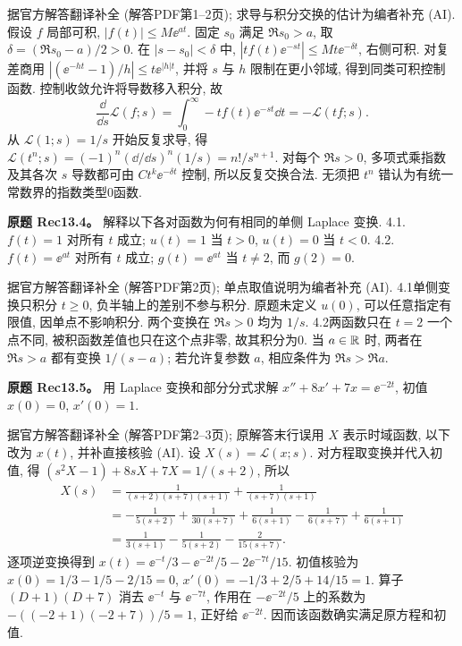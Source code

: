 \begin{solution}
据官方解答翻译补全 (解答PDF第1--2页); 求导与积分交换的估计为编者补充 (AI). 假设 $f$ 局部可积, $|f(t)|\le M\ee^{at}$. 固定 $s_0$ 满足 $\Re s_0>a$, 取 $\delta=(\Re s_0-a)/2>0$. 在 $|s-s_0|<\delta$ 中, $|t f(t)\ee^{-st}|\le Mt\ee^{-\delta t}$, 右侧可积. 对复差商用 $|(\ee^{-ht}-1)/h|\le t\ee^{|h|t}$, 并将 $s$ 与 $h$ 限制在更小邻域, 得到同类可积控制函数. 控制收敛允许将导数移入积分, 故
\[
\frac{\dd}{\dd s}\mathcal L(f;s)=\int_0^\infty -tf(t)\ee^{-st}\dd t=-\mathcal L(tf;s).
\]
从 $\mathcal L(1;s)=1/s$ 开始反复求导, 得 $\mathcal L(t^n;s)=(-1)^n(\dd/\dd s)^n(1/s)=n!/s^{n+1}$. 对每个 $\Re s>0$, 多项式乘指数及其各次 $s$ 导数都可由 $C t^k\ee^{-\delta t}$ 控制, 所以反复交换合法. 无须把 $t^n$ 错认为有统一常数界的指数类型0函数.
\end{solution}
\begin{exercise}
\textbf{原题 Rec13.4。}\label{ass:rec13-4}
解释以下各对函数为何有相同的单侧 Laplace 变换. 4.1. $f(t)=1$ 对所有 $t$ 成立; $u(t)=1$ 当 $t>0$, $u(t)=0$ 当 $t<0$. 4.2. $f(t)=\ee^{at}$ 对所有 $t$ 成立; $g(t)=\ee^{at}$ 当 $t\ne2$, 而 $g(2)=0$.
\end{exercise}
\begin{solution}
据官方解答翻译补全 (解答PDF第2页); 单点取值说明为编者补充 (AI). 4.1单侧变换只积分 $t\ge0$, 负半轴上的差别不参与积分. 原题未定义 $u(0)$, 可以任意指定有限值, 因单点不影响积分. 两个变换在 $\Re s>0$ 均为 $1/s$. 4.2两函数只在 $t=2$ 一个点不同, 被积函数差值也只在这个点非零, 故其积分为0. 当 $a\in\mathbb R$ 时, 两者在 $\Re s>a$ 都有变换 $1/(s-a)$; 若允许复参数 $a$, 相应条件为 $\Re s>\Re a$.
\end{solution}
\begin{exercise}
\textbf{原题 Rec13.5。}\label{ass:rec13-5}
用 Laplace 变换和部分分式求解 $x''+8x'+7x=\ee^{-2t}$, 初值 $x(0)=0$, $x'(0)=1$.
\end{exercise}
\begin{solution}
据官方解答翻译补全 (解答PDF第2--3页); 原解答末行误用 $X$ 表示时域函数, 以下改为 $x(t)$, 并补直接核验 (AI). 设 $X(s)=\mathcal L(x;s)$. 对方程取变换并代入初值, 得 $(s^2X-1)+8sX+7X=1/(s+2)$, 所以
\begin{align*}
X(s)&=\frac1{(s+2)(s+7)(s+1)}+\frac1{(s+7)(s+1)}\\
&=-\frac{1}{5(s+2)}+\frac{1}{30(s+7)}+\frac{1}{6(s+1)}
-\frac{1}{6(s+7)}+\frac{1}{6(s+1)}\\
&=\frac{1}{3(s+1)}-\frac{1}{5(s+2)}-\frac{2}{15(s+7)}.
\end{align*}
逐项逆变换得到 $x(t)=\ee^{-t}/3-\ee^{-2t}/5-2\ee^{-7t}/15$. 初值核验为 $x(0)=1/3-1/5-2/15=0$, $x'(0)=-1/3+2/5+14/15=1$. 算子 $(D+1)(D+7)$ 消去 $\ee^{-t}$ 与 $\ee^{-7t}$, 作用在 $-\ee^{-2t}/5$ 上的系数为 $-((-2+1)(-2+7))/5=1$, 正好给 $\ee^{-2t}$. 因而该函数确实满足原方程和初值.
\end{solution}
